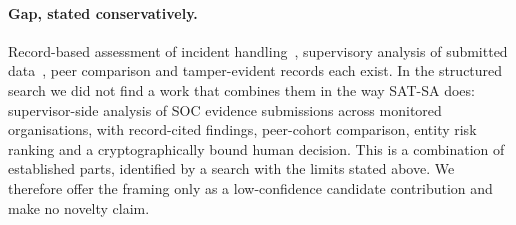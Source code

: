 \paragraph{Gap, stated conservatively.}
Record-based assessment of incident handling~\cite{palma2024compliance}, supervisory
analysis of submitted data~\cite{broeders2018suptech}, peer comparison and
tamper-evident records each exist. In the structured search we did not find a work
that combines them in the way SAT-SA does: supervisor-side analysis of SOC evidence
submissions across monitored organisations, with record-cited findings, peer-cohort
comparison, entity risk ranking and a cryptographically bound human decision. This
is a combination of established parts, identified by a search with the limits
stated above. We therefore offer the framing only as a low-confidence candidate
contribution and make no novelty claim.
